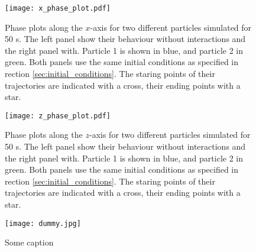 \begin{figure}[h!]
    \texttt{[image: x\_phase\_plot.pdf]}
    \caption{Phase plots along the $x$-axis for two different particles simulated for 50 \textmu s. The left panel show their behaviour without interactions and the right panel with. Particle 1 is shown in blue, and particle 2 in green. Both panels use the same initial conditions as specified in rection \ref{sec:initial_conditions}. The staring points of their trajectories are indicated with a cross, their ending points with a star.}
    \label{fig:x_phase_two_particles}
\end{figure}

\begin{figure}[h!]
    \texttt{[image: z\_phase\_plot.pdf]}
    \caption{Phase plots along the $z$-axis for two different particles simulated for 50 \textmu s. The left panel show their behaviour without interactions and the right panel with. Particle 1 is shown in blue, and particle 2 in green. Both panels use the same initial conditions as specified in rection \ref{sec:initial_conditions}. The staring points of their trajectories are indicated with a cross, their ending points with a star.}
    \label{fig:z_phase_two_particles}
\end{figure}

\begin{figure}[h!]
    \texttt{[image: dummy.jpg]}
    \caption{Some caption}
    \label{fig:some_ref} 
\end{figure}




\twocolumngrid
 






